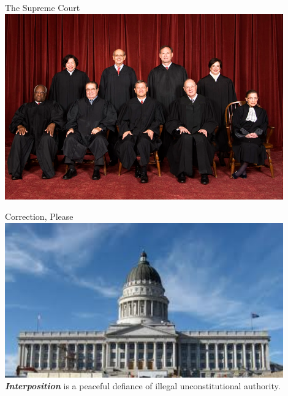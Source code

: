\begin{frame}{The Supreme Court}
    \centering
    \includegraphics[width=0.9\textwidth]{img/supreme.png} \\
\end{frame}

\begin{frame}{Correction, Please}
    \centering
    \includegraphics[width=0.9\textwidth]{img/capitol.png} \\
    \large{\emph{\textbf{Interposition}} is a peaceful defiance of illegal unconstitutional authority. \\}
\end{frame}


